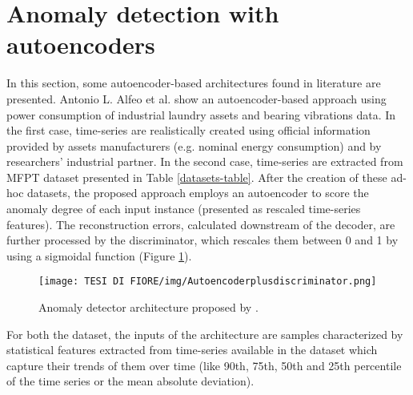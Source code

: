 \section{Anomaly detection with autoencoders}
In this section, some autoencoder-based architectures found in literature are presented.
Antonio L. Alfeo et al. \cite{12UsingAEinManufacturing} show an autoencoder-based approach using power consumption of industrial laundry assets and bearing vibrations data. In the first case, time-series are realistically created using official information provided by assets manufacturers (e.g. nominal energy consumption) and by researchers' industrial partner. In the second case, time-series are extracted from MFPT dataset presented in Table \ref{datasets-table}. After the creation of these ad-hoc datasets, the proposed approach employs an autoencoder to score the anomaly degree of each input instance (presented as rescaled time-series features). The reconstruction errors, calculated downstream of the decoder, are further processed by the discriminator, which rescales them between 0 and 1 by using a sigmoidal function (Figure \ref{autoencoder_plus_discriminator}).
\begin{figure}[ht]
\texttt{[image: TESI DI FIORE/img/Autoencoderplusdiscriminator.png]}
\centering
\caption{Anomaly detector architecture proposed by \cite{12UsingAEinManufacturing}.}
\label{autoencoder_plus_discriminator}
\end{figure}
For both the dataset, the inputs of the architecture are samples characterized by statistical features extracted from time-series available in the dataset which capture their trends of them over time (like 90th, 75th, 50th and 25th percentile of the time series or the mean absolute deviation).\\
